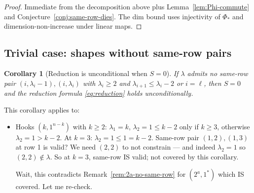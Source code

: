 \documentclass[11pt]{article}
\newtheorem{corollary}[theorem]{Corollary}
\theoremstyle{definition}
\begin{document}
\begin{proof}
Immediate from the decomposition above plus
Lemma~\ref{lem:Phi-commute} and
Conjecture~\ref{conj:same-row-dies}. The dim bound uses injectivity of
$\Phi_*$ and dimension-non-increase under linear maps.
\end{proof}

\subsection{Trivial case: shapes without same-row pairs}

\begin{corollary}[Reduction is unconditional when $S = 0$]\label{cor:S-zero}
If $\lambda$ admits no same-row pair $(i, \lambda_i - 1), (i, \lambda_i)$
with $\lambda_i \ge 2$ and $\lambda_{i+1} \le \lambda_i - 2$ or $i = \ell$,
then $S = 0$ and the reduction formula \eqref{eq:reduction} holds
unconditionally.
\end{corollary}

\noindent This corollary applies to:
\begin{itemize}[leftmargin=2em,topsep=0.2em,itemsep=0.1em]
\item Hooks $(k, 1^{n-k})$ with $k \ge 2$: $\lambda_1 = k$, $\lambda_2 = 1 \le k - 2$
only if $k \ge 3$, otherwise $\lambda_2 = 1 > k - 2$. At $k = 3$:
$\lambda_2 = 1 \le 1 = k - 2$. Same-row pair $(1, 2), (1, 3)$ at row 1
is valid? We need $(2, 2)$ to not constrain — and indeed $\lambda_2 = 1$
so $(2, 2) \notin \lambda$. So at $k = 3$, same-row IS valid; not
covered by this corollary.

Wait, this contradicts Remark~\ref{rem:2a-no-same-row} for $(2^a, 1^*)$ which IS
covered. Let me re-check.
\end{itemize}
\end{document}
